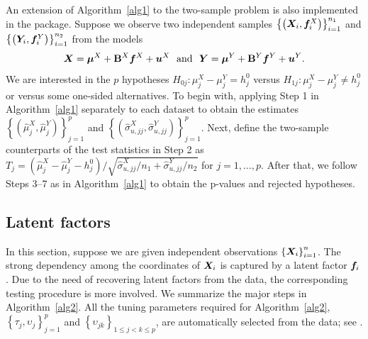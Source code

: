 An extension of Algorithm~\ref{alg1} to the two-sample problem is also implemented in the package. Suppose we observe two independent samples $\left\{ \left( \bm{X}_i, \bm f^X_i \right) \right\}_{i=1}^{n_1}$  and  $\left\{  \left(\bm{Y}_i, \bm f^Y_i \right) \right\}_{i=1}^{n_2}$ from the models
\begin{align}
	\bm{X} = \bm{\mu}^X + \mathbf{B}^X \bm f^X + \bm{u}^X ~\mbox{ and }~ 	\bm{Y} = \bm{\mu}^Y + \mathbf{B}^Y \bm f^Y+ \bm{u}^Y.   \label{factor.model.twosample}
\end{align}
We are interested in the $p$ hypotheses $H_{0j}: \mu_j^X-\mu_j^Y =h_j^0$ versus $H_{1j}:  \mu_j^X-\mu_j^Y \neq h_j^0$ or versus some one-sided alternatives. To begin with, applying Step 1 in  Algorithm~\ref{alg1} separately to each dataset to obtain the estimates $\left\{\left(\hat{\mu}^X_j, \hat{\mu}^Y_j\right)\right\}_{j=1}^p$ and $\left\{\left(\hat{\sigma}^{X}_{u, jj}  , \hat{\sigma}^{ Y}_{u, jj}\right) \right\}_{j=1}^p$. Next, define the two-sample counterparts of the test statistics in Step 2 as
$ T_j=\left(  \hat{\mu}^X_{j}-\hat{\mu}^Y_{j}-h^0_j \right)/ \sqrt{ \hat{\sigma}^{X}_{u, jj} / n_1  + \hat{\sigma}^{ Y}_{u,jj}/n_2 }$ for $j=1,\ldots, p$.
After that, we follow Steps 3--7 as in  Algorithm~\ref{alg1}  to obtain the p-values and rejected hypotheses.


 \subsection{Latent factors}\label{sec:unknown_f}

In this section, suppose we are given independent observations $
\left\{ \bm{X}_i\right\}_{i=1}^n$. The strong dependency among the coordinates of $\bm{X}_i$  is captured by a  latent factor $\bm f_i$ \citep{LS2008}. Due to the need of recovering latent factors from the data, the corresponding  testing procedure is more involved. We summarize the major steps in Algorithm~\ref{alg2}. All the tuning parameters required for Algorithm~\ref{alg2}, $\left\{ \tau_j, \upsilon_j\right\}_{j=1}^p$ and $\left\{ \upsilon_{jk} \right\}_{1\leq j<k\leq p}$, are automatically selected from the data; see .


